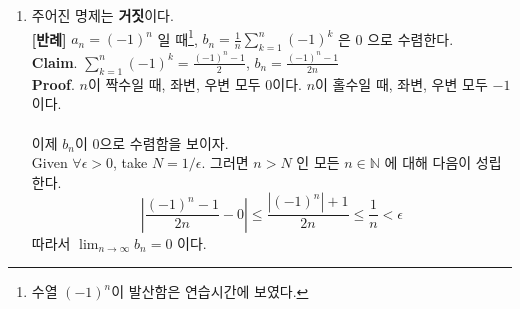 \documentclass[12pt]{report}
\newcommand{\numl}[1]{\item[\large\textbf{\sffamily #1.}]}
\newcommand{\bb}[1]{\mathbb{#1}}
\newcommand{\ra}{\rightarrow}
\newcommand{\abs}[1]{\left|#1\right|}
\newcommand{\ds}{\displaystyle}
\begin{document}
\begin{enumerate}
\numl{8} 주어진 명제는 \textbf{거짓}이다.\\
\textbf{[반례]} $a_n = (-1)^n$ 일 때\footnote{수열 $(-1)^n$이 발산함은 연습시간에 보였다.}, $b_n = \ds \frac{1}{n}\sum_{k=1}^n (-1)^k$ 은 0 으로 수렴한다.\\
\textbf{Claim}. $\ds\sum_{k=1}^n (-1)^k = \frac{(-1)^n-1}{2}$, $b_n = \ds\frac{(-1)^n-1}{2n}$\\
\textbf{Proof}. $n$이 짝수일 때, 좌변, 우변 모두 0이다. $n$이 홀수일 때, 좌변, 우변 모두 $-1$ 이다.\\\\
이제 $b_n$이 0으로 수렴함을 보이자.\\
Given $\forall \epsilon >0$, take $N = 1/\epsilon$. 그러면 $n>N$ 인 모든 $n\in \bb{N}$ 에 대해 다음이 성립한다.
$$\abs{\frac{(-1)^n - 1}{2n} - 0} \leq \frac{\abs{(-1)^n} + 1}{2n} \leq \frac{1}{n} < \epsilon$$
따라서 $\ds\lim_{n \ra \infty}b_n = 0$ 이다.

\end{enumerate}
\end{document}
